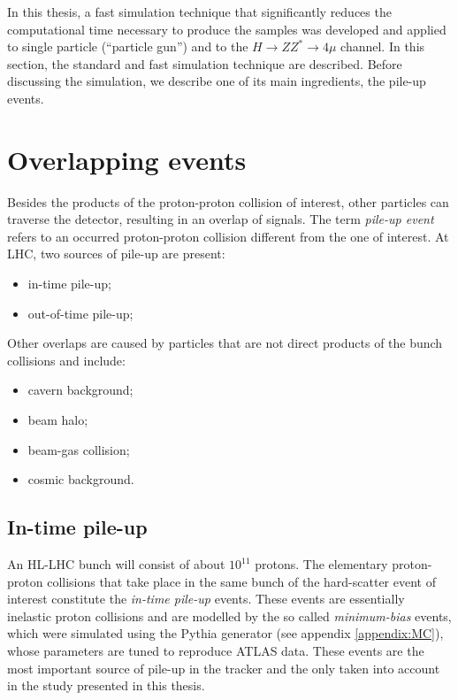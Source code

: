 \documentclass[a4paper,twoside,12pt]{book}
\begin{document}
In this thesis, a fast simulation technique that
significantly reduces the computational time necessary to produce the samples was developed and applied to single particle (``particle gun'') and to the $H \rightarrow ZZ^{*} \rightarrow 4\mu$ channel. In this section, the standard and fast simulation technique are described. Before discussing the simulation, we describe one of its main ingredients, 
the pile-up events. 

\section{Overlapping events}
Besides the products of the proton-proton collision of interest, other particles can traverse the detector, resulting in an overlap of signals. The term \textit{pile-up event} refers to an occurred proton-proton collision different from the one of interest. At LHC, two sources of pile-up are present:

\begin{itemize}
\item in-time pile-up;
\item out-of-time pile-up;
\end{itemize}

Other overlaps are caused by particles that are not direct products of the bunch collisions and include:

\begin{itemize}
\item cavern background;
\item beam halo;
\item beam-gas collision;
\item cosmic background.
\end{itemize}

\subsection*{In-time pile-up}
An HL-LHC bunch will consist of about $10^{11}$ protons. The elementary
proton-proton collisions that take place in the same bunch of the hard-scatter event of
interest constitute the \textit{in-time pile-up} events. These events are essentially inelastic proton collisions and are modelled by the so called
\textit{minimum-bias} events, which were simulated using the Pythia generator (see appendix \ref{appendix:MC}), whose parameters
are tuned to reproduce ATLAS data. These events are the most
important source of pile-up in the tracker and the only taken into account in the study presented in this thesis. \\
\end{document}
